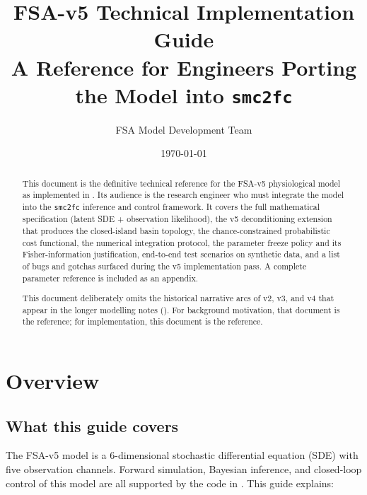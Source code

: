 \documentclass[11pt,a4paper]{article}
\title{FSA-v5 Technical Implementation Guide \\
\large A Reference for Engineers Porting the Model into \texttt{smc2fc}}
\author{FSA Model Development Team}
\date{\today}
\theoremstyle{definition}
\begin{document}
\maketitle

\begin{abstract}
\noindent
This document is the definitive technical reference for the FSA-v5
physiological model as implemented in . Its
audience is the research engineer who must integrate the model into the
\texttt{smc2fc} inference and control framework. It covers the full
mathematical specification (latent SDE + observation likelihood), the
v5 deconditioning extension that produces the closed-island basin
topology, the chance-constrained probabilistic cost functional, the
numerical integration protocol, the parameter freeze policy and its
Fisher-information justification, end-to-end test scenarios on
synthetic data, and a list of bugs and gotchas surfaced during the v5
implementation pass. A complete parameter reference is included as an
appendix.

This document deliberately omits the historical narrative arcs of v2,
v3, and v4 that appear in the longer modelling notes ().
For background motivation, that document is the reference; for
implementation, this document is the reference.
\end{abstract}

\tableofcontents
\newpage

\section{Overview} \label{sec:overview}

\subsection{What this guide covers}

The FSA-v5 model is a 6-dimensional stochastic differential equation
(SDE) with five observation channels. Forward simulation, Bayesian
inference, and closed-loop control of this model are all supported by
the code in . This guide explains:
\end{document}
